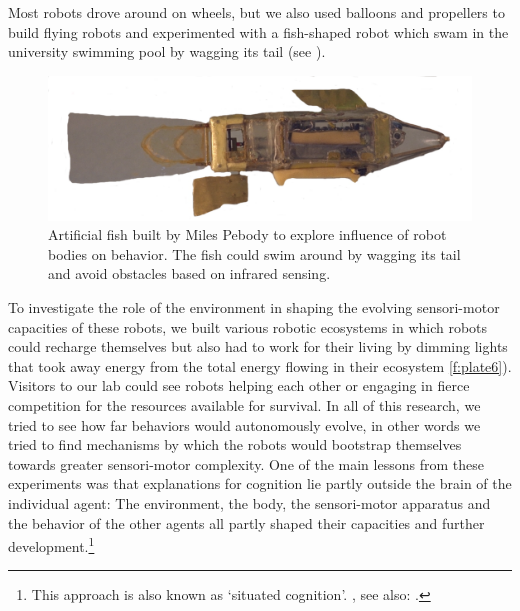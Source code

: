 Most robots drove around on wheels, but we also used balloons and propellers to build 
flying robots and experimented with a fish-shaped robot which swam in the university swimming pool by wagging 
its tail (see ). 


\begin{figure}[htbp]
  \centerline{\includegraphics[width=.85\textwidth]{chap1/figs/fish}}
\caption{ Artificial fish built by Miles Pebody to explore influence of robot bodies on behavior. The fish could swim around by wagging 
its tail and avoid obstacles based on infrared sensing.}
\label{f:plate4}
\end{figure}

To investigate the role of the environment in shaping the
evolving sensori-motor capacities of these robots, 
we built various robotic 
ecosystems in which robots could recharge themselves but also
had to work for their living by 
dimming lights that took away energy from the total energy 
flowing in their ecosystem  \ref{f:plate6}). Visitors
to our lab could see robots helping each other or 
engaging in fierce competition for
the resources available for survival. In all of this
research, we tried to see how far behaviors would
autonomously evolve, in other words we tried to find 
mechanisms by which the robots would bootstrap themselves 
towards greater sensori-motor complexity. One of the 
main lessons from these experiments was that 
explanations for cognition lie partly outside the brain 
of the individual agent: The environment, the body, the 
sensori-motor apparatus and the behavior of the other 
agents all partly shaped their capacities and 
further development.\footnote{This approach is also known as `situated cognition'. 
\cite{Clancey:1997}, see also: \cite{Varela:1991}.}


